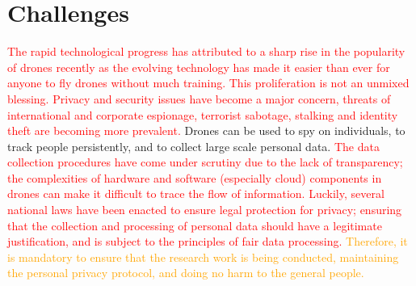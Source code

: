 \section{Challenges}
\label{challengesection}
\textcolor{red}{
The rapid technological progress has attributed to a sharp rise in the popularity of drones recently as the evolving technology has made it easier than ever for anyone to fly drones without much training. This proliferation is not an unmixed blessing. Privacy and security\cite{custers2016flying} issues have become a major concern, threats of international and corporate espionage, terrorist sabotage, stalking and identity theft are becoming more prevalent.
}
Drones can be used to spy on individuals, to track people persistently, and to collect large scale personal data. 
\textcolor{red}{
The data collection procedures  have come under scrutiny due to the lack of transparency;
the complexities of hardware and software (especially cloud) components in drones can make it difficult to trace the flow of information. Luckily, several national laws have been enacted to ensure legal protection for privacy; ensuring that the collection and processing of personal data should have a legitimate justification, and is subject to the principles of fair data processing.} \textcolor{orange}{Therefore, it is mandatory to ensure that the research work is being conducted, maintaining the personal privacy protocol, and doing no harm to the general people.}

